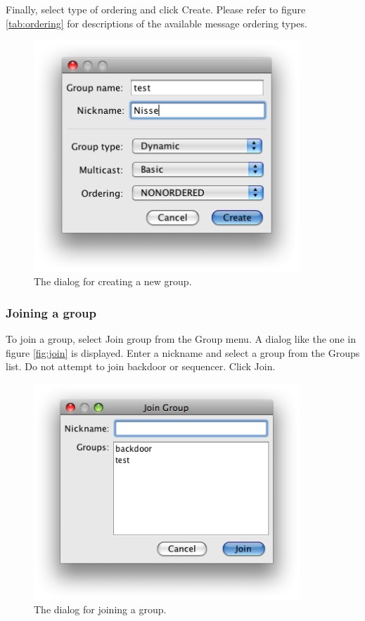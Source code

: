 \documentclass[a4paper,english]{article}
\begin{document}
Finally, select type of ordering and click Create. Please refer to figure \vref{tab:ordering} for descriptions of the available message ordering types.


\begin{figure}
\centering \includegraphics[width=10cm]{gui2.png}
\caption{The dialog for creating a new group.}
\label{fig:creat}
\end{figure}


\subsubsection{Joining a group}
To join a group, select Join group from the Group menu. A dialog like the one in figure \vref{fig:join} is displayed. Enter a nickname and select a group from the Groups list. Do not attempt to join backdoor or sequencer. Click Join.

\begin{figure}
\centering \includegraphics[width=10cm]{gui4.png}
\caption{The dialog for joining a group.}
\label{fig:join}
\end{figure}
\end{document}
